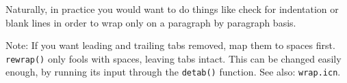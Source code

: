 \noindent Naturally, in practice you would want to do things like check for
indentation or blank lines in order to wrap only on a paragraph by
paragraph basis. %




Note: If you want
leading and trailing tabs removed, map them to spaces first.
\texttt{rewrap()} only fools with spaces, leaving tabs intact. This can
be changed easily enough, by running its input through the
\texttt{detab()} function.
See also: \texttt{wrap.icn}.

